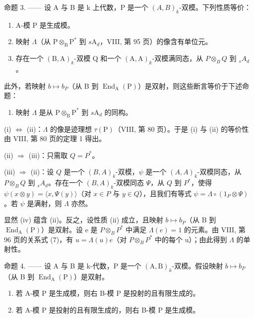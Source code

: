 命题 3. —— 设 A 与 B 是 k 上代数，P 是一个 \((A,B)_{k}\)-双模。下列性质等价：

\begin{enumerate}
\def\labelenumi{(\roman{enumi})}
\item
  A-模 P 是生成模。
\item
  映射 \(\Lambda\)（从 \(\mathrm{P} \otimes_{\mathrm{B}} \mathrm{P}^{*}\) 到 \(s\mathrm{A}_{d}\)，VIII, 第 95 页）的像含有单位元。
\item
  存在一个 \((\mathrm{B},\mathrm{A})_{k}\)-双模 Q 和一个 \((\mathrm{A},\mathrm{A})_{k}\)-双模满同态，从 \(P\otimes_{B}Q\) 到 \(_{s}A_{d}\)。
\end{enumerate}

此外，若映射 \(b \mapsto b_{P}\)（从 B 到 \(\operatorname{End}_{\mathrm{A}}(\mathrm{P})\)）是双射，则这些断言等价于下述命题：

\begin{enumerate}
\def\labelenumi{(\roman{enumi})}
\setcounter{enumi}{3}
\tightlist
\item
  映射 \(\Lambda\) 是从 \(\mathrm{P} \otimes_{\mathrm{B}} \mathrm{P}^{*}\) 到 \(s\mathrm{A}_d\) 的同构。
\end{enumerate}

(i) \(\Leftrightarrow\) (ii)：\(\Lambda\) 的像是迹理想 \(\tau(\mathrm{P})\)（VIII, 第 80 页）。于是 (i) 与 (ii) 的等价性由 VIII, 第 80 页的定理 1 得出。

(ii) \(\Rightarrow\) (iii)：只需取 \(Q = P^{*}\)。

(iii) \(\Rightarrow\) (ii)：设 \(Q\) 是一个 \((B,A)_k\)-双模，\(\psi\) 是一个 \((A,A)_k\)-双模同态，从 \(P \otimes_B Q\) 到 \({}_s A_d\)。存在一个 \((B,A)_k\)-双模同态 \(\Psi\)，从 \(Q\) 到 \(P^*\)，使得 \(\psi(x \otimes y) = \langle x, \Psi(y) \rangle\)（对 \(x \in P\) 与 \(y \in Q\)），且我们有等式 \(\psi = \Lambda \circ (1_P \otimes \Psi)\)。若 \(\psi\) 是满射，则 \(\Lambda\) 亦然。

显然 (iv) 蕴含 (ii)。反之，设性质 (ii) 成立，且映射 \(b \mapsto b_{P}\)（从 B 到 \(\operatorname{End}_{\mathrm{A}}(\mathrm{P})\)）是双射。设 e 是 \(P \otimes_{B} P^{*}\) 中满足 \(\Lambda(e) = 1\) 的元素。由 VIII, 第 96 页的关系式 (7)，有 \(u = \Lambda(u)e\)（对 \(P \otimes_{B} P^{*}\) 中的每个 u）；由此得到 \(\Lambda\) 的单射性。

命题 4. —— 设 A 与 B 是 k-代数，P 是一个 \((\mathrm{A},\mathrm{B})_{k}\)-双模。假设映射 \(b\mapsto b_{P}\)（从 B 到 \(\operatorname{End}_{\mathrm{A}}(\mathrm{P})\)）是双射。

\begin{enumerate}
\def\labelenumi{\alph{enumi})}
\item
  若 A-模 P 是生成模，则右 B-模 P 是投射的且有限生成的。
\item
  若 A-模 P 是投射的且有限生成的，则右 B-模 P 是生成模。
\end{enumerate}

